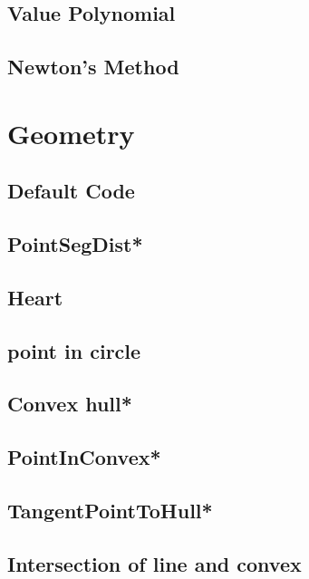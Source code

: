\subsection{Value Polynomial}

\subsection{Newton's Method}


\section{Geometry}
\subsection{Default Code}

\subsection{PointSegDist*} %

\subsection{Heart}

\subsection{point in circle}

\subsection{Convex hull*} %

\subsection{PointInConvex*} %

\subsection{TangentPointToHull*} %

\subsection{Intersection of line and convex} %

